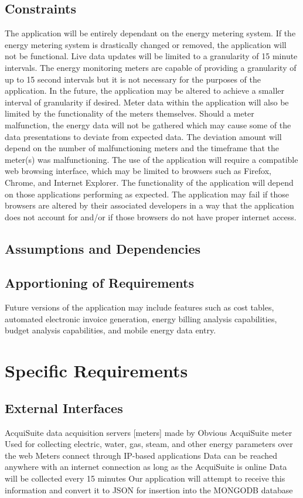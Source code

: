 \documentclass[onecolumn, draftclsnofoot,10pt, compsoc]{IEEEtran}
\begin{document}
    \subsection{Constraints}
    The application will be entirely dependant on the energy metering system. If the energy metering system is drastically changed or removed, the application will not be functional. Live data updates will be limited to a granularity of 15 minute intervals. The energy monitoring meters are capable of providing a granularity of up to 15 second intervals but it is not necessary for the purposes of the application. In the future, the application may be altered to achieve a smaller interval of granularity if desired. Meter data within the application will also be limited by the functionality of the meters themselves. Should a meter malfunction, the energy data will not be gathered which may cause some of the data presentations to deviate from expected data. The deviation amount will depend on the number of malfunctioning meters and the timeframe that the meter(s) was malfunctioning. The use of the application will require a compatible web browsing interface, which may be limited to browsers such as Firefox, Chrome, and Internet Explorer. The functionality of the application will depend on those applications performing as expected. The application may fail if those browsers are altered by their associated developers in a way that the application does not account for and/or if those browsers do not have proper internet access.
    \subsection{Assumptions and Dependencies}
    \subsection{Apportioning of Requirements}
    Future versions of the application may include features such as cost tables, automated electronic invoice generation, energy billing analysis capabilities, budget analysis capabilities, and mobile energy data entry.
    \section{Specific Requirements}
    
    \subsection{External Interfaces}
    AcquiSuite data acquisition servers [meters] made by Obvious
    AcquiSuite meter
    Used for collecting electric, water, gas, steam, and other energy parameters over the web
    Meters connect through IP-based applications
    Data can be reached anywhere with an internet connection as long as the AcquiSuite is online
    Data will be collected every 15 minutes
    Our application will attempt to receive this information and convert it to JSON for insertion into the MONGODB database
    
\end{document}
